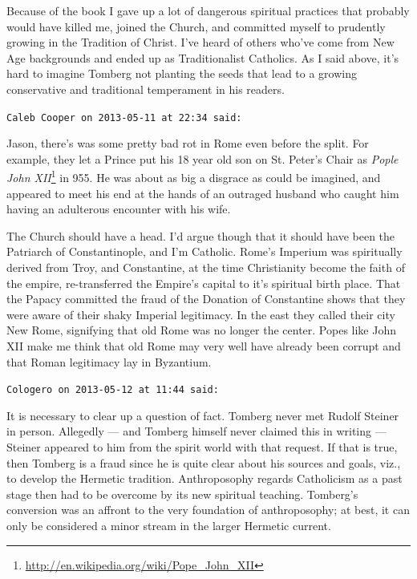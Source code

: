 \begin{footnotesize}
\begin{sffamily}
Because of the book I gave up a lot of dangerous spiritual practices that probably would have killed me, joined the Church, and committed myself to prudently growing in the Tradition of Christ. I've heard of others who've come from New Age backgrounds and ended up as Traditionalist Catholics. As I said above, it's hard to imagine Tomberg not planting the seeds that lead to a growing conservative and traditional temperament in his readers.

\hfill

\texttt{Caleb Cooper on 2013-05-11 at 22:34 said:}

Jason, there's was some pretty bad rot in Rome even before the split. For example, they let a Prince put his 18 year old son on St. Peter's Chair as \textit{Pople John XII}\footnote{\url{http://en.wikipedia.org/wiki/Pope_John_XII}} in 955. He was about as big a disgrace as could be imagined, and appeared to meet his end at the hands of an outraged husband who caught him having an adulterous encounter with his wife.

The Church should have a head. I'd argue though that it should have been the Patriarch of Constantinople, and I'm Catholic. Rome's Imperium was spiritually derived from Troy, and Constantine, at the time Christianity become the faith of the empire, re-transferred the Empire's capital to it's spiritual birth place. That the Papacy committed the fraud of the Donation of Constantine shows that they were aware of their shaky Imperial legitimacy. In the east they called their city New Rome, signifying that old Rome was no longer the center. Popes like John XII make me think that old Rome may very well have already been corrupt and that Roman legitimacy lay in Byzantium.

\hfill

\texttt{Cologero on 2013-05-12 at 11:44 said:}

It is necessary to clear up a question of fact. Tomberg never met Rudolf Steiner in person. Allegedly --- and Tomberg himself never claimed this in writing --- Steiner appeared to him from the spirit world with that request. If that is true, then Tomberg is a fraud since he is quite clear about his sources and goals, viz., to develop the Hermetic tradition. Anthroposophy regards Catholicism as a past stage then had to be overcome by its new spiritual teaching. Tomberg's conversion was an affront to the very foundation of anthroposophy; at best, it can only be considered a minor stream in the larger Hermetic current.


\end{sffamily}
\end{footnotesize}
